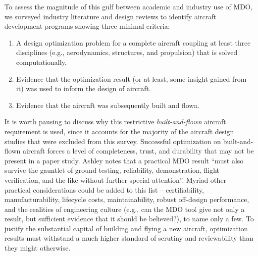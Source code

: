 \documentclass[12pt,vi,oneside]{report}
\begin{document}
    To assess the magnitude of this gulf between academic and industry use of MDO, we surveyed industry literature and design reviews to identify aircraft development programs showing three minimal criteria:
    \begin{enumerate}[noitemsep]
        \item A design optimization problem for a complete aircraft coupling at least three disciplines (e.g., aerodynamics, structures, and propulsion) that is solved computationally.
        \item Evidence that the optimization result (or at least, some insight gained from it) was used to inform the design of aircraft.
        \item Evidence that the aircraft was subsequently built and flown.
    \end{enumerate}

    \noindent It is worth pausing to discuss why this restrictive \textit{built-and-flown} aircraft requirement is used, since it accounts for the majority of the aircraft design studies that were excluded from this survey. Successful optimization on built-and-flown aircraft forces a level of completeness, trust, and durability that may not be present in a paper study. Ashley notes that a practical MDO result ``must also survive the gauntlet of ground testing, reliability, demonstration, flight verification, and the like without further special attention''. \cite{ashley_making_1982} Myriad other practical considerations could be added to this list -- certifiability, manufacturability, lifecycle costs, maintainability, robust off-design performance, and the realities of engineering culture (e.g., can the MDO tool give not only a result, but sufficient evidence that it should be believed?), to name only a few. To justify the substantial capital of building and flying a new aircraft, optimization results must withstand a much higher standard of scrutiny and reviewability than they might otherwise.

\end{document}
